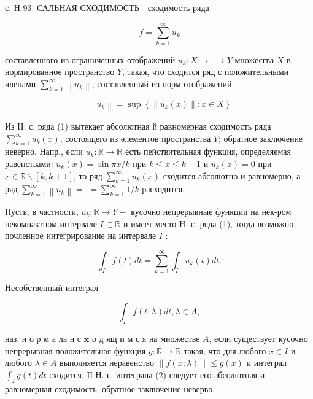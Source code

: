 \documentclass[10pt]{article}
\begin{document}
с. Н-93. САЛЬНАЯ СХОДИМОСТЬ - сходимость ряда



\[

f=\sum_{k=1}^{\infty} u_{k}

\]



составленного из ограниченных отображений $u_{k}: X \rightarrow$ $\rightarrow Y$ множесгва $X$ в нормированное пространство $Y$, такая, что сходится ряд с положительными членами $\sum_{k=1}^{\infty}\left\|u_{k}\right\|$, составленный из норм отображений



\[

\left\|u_{k}\right\|=\sup \left\{\left\|u_{k}(x)\right\|: x \in X\right\}

\]



Из Н. с. ряда (1) вытекает абсолютная й равномерная сходимость ряда $\sum_{k=1}^{\infty} u_{k}(x)$, состоящего из әлементов пространства $Y$; обратное заключение неверно. Напр., если $u_{k}: \mathbb{R} \rightarrow \mathbb{R}$ есть пействительная функция, определяемая равенствами: $u_{k}(x)=\sin \pi x / k$ при $k \leqslant x \leqslant k+1$ и $u_{k}(x)=0$ при $x \in \mathbb{R} \backslash[k, k+1]$, то ряд $\sum_{k=1}^{\infty} u_{k}(x)$ сходится абсолютно и равномерно, а ряд $\sum_{k=1}^{\infty}\left\|u_{k}\right\|=$ $=\sum_{k=1}^{\infty} 1 / k$ расходится.



Пусть, в частности, $u_{k}: \mathbb{R} \rightarrow Y-$ кусочно непрерывные функции на нек-ром некомпактном интервале $I \subset \mathbb{R}$ и имеет место H. с. ряда (1), тогда возможно почленное интегрирование на интервале $I$ :



\[

\int_{I} f(t) d t=\sum_{k=1}^{\infty} \int_{I} u_{k}(t) d t .

\]



Несобственный интеграл



\[

\int_{I} f(t ; \lambda) d t, \lambda \in A,

\]



наз. н о р м а ль н с $\mathbf{x}$ о д ящ и м с я на множестве $A$, если существует кусочно непрерывная положительная функция $g: \mathbb{R} \rightarrow \mathbb{R}$ такая, что для любого $x \in I$ и любого $\lambda \in A$ выполняется неравенство $\|f(x ; \lambda)\| \leqslant g(x)$ и интеграл $\int_{I} g(t) d t$ сходится. ІІ Н. с. интеграла (2) следует его абсолютная и равномерная сходимость; обратное заключение неверво.
\end{document}
